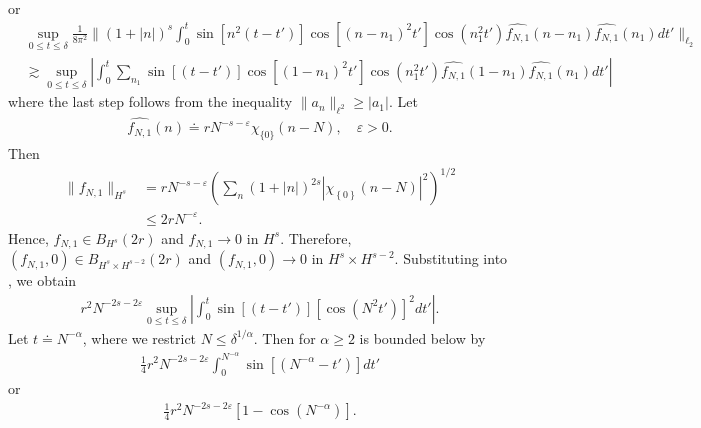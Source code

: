 \documentclass[12pt,reqno]{amsart}
\numberwithin{equation}{section}  %
\renewcommand{\cref}{\Cref}
\newcommand{\wh}{\widehat}
\newcommand{\ee}{\varepsilon}
\begin{document}
%
%
or 
%
%
\begin{equation}
  \label{yut}
\begin{split}
& \sup_{0 \le t \le \delta} \frac{1}{8 \pi^{2}}\| (1 + | n |)^{s}
\int_{0}^{t} \sin[n^{2}(t-t')] \cos[(n - n_{1})^{2}t']
\cos(n_{1}^{2}t') \wh{f_{N,1}}(n - n_{1})\wh{f_{N,1}}(n_{1}) dt'
\|_{\ell_{2}}
\\
& \gtrsim \sup_{0 \le t \le \delta} 
| \int_{0}^{t} \sum_{n_{1}} \sin[(t-t')] \cos[(1 -n_{1})^{2}t']
\cos(n_{1}^{2}t') \wh{f_{N,1}}(1 - n_{1})\wh{f_{N,1}}(n_{1}) dt' |
\end{split}
\end{equation}
%
%
%
%
%
%
%
%
%
where the last step follows from the inequality $\| a_{n} \|_{\ell^{2}} \ge
|a_{1}|$. Let
%
%
\begin{equation}
  \label{ill-pos-ce}
\begin{split}
  \wh{f_{N,1}}(n) \doteq r N^{-s - \ee} \chi_{\{{0}\}} (n - N), \quad \ee > 0.
\end{split}
\end{equation}
%
%
Then
%
%
\begin{equation*}
\begin{split}
  \| f_{N,1} \|_{H^{s}}
  & = rN^{-s -\ee} \left( \sum_{n} (1 + | n |)^{2s} |
  \chi_{\left\{0 \right\}} (n - N) |^{2} \right)^{1/2}
  \\
  & \le 2rN^{-\ee}.
\end{split}
\end{equation*}
%
%
Hence, $f_{N,1} \in B_{H^{s}}(2r)$ and $f_{N,1} \to 0$ in $H^{s}$. Therefore,
$(f_{N,1}, 0) \in B_{H^{s} \times H^{s-2}}(2r)$ and $(f_{N,1}, 0) \to 0$ in
$H^{s} \times H^{s-2}$. Substituting
\cref{ill-pos-ce} into \cref{yut}, we obtain
%
%
\begin{equation}
  \label{rxx}
\begin{split}
  r^{2}N^{-2s -2 \ee} \sup_{0 \le t \le \delta} 
  | \int_{0}^{t} \sin[(t-t')] [\cos(N^{2}t')]^{2} dt' |.
\end{split}
\end{equation}
%
Let $t \doteq N^{-\alpha}$, where we restrict $N \le
\delta^{1/\alpha}$. Then for $\alpha \ge 2$ \cref{rxx} is bounded below by
%
%
%
%
\begin{equation*}
\begin{split}
\frac{1}{4} r^{2}N^{-2s -2 \ee}  
\int_{0}^{N^{-\alpha}} \sin[(N^{-\alpha}-t')] dt'
\end{split}
\end{equation*}
%
%
or
%
%
\begin{equation*}
\begin{split}
\frac{1}{4} r^{2} N^{-2s -2 \ee}  
[1 - \cos(N^{-\alpha})].
\end{split}
\end{equation*}
\end{document}
